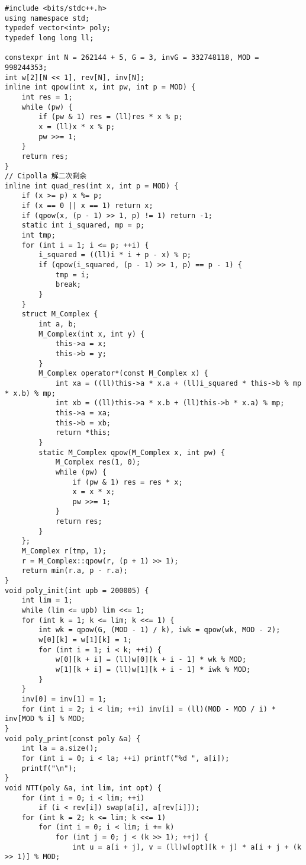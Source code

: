 \begin{verbatim}
#include <bits/stdc++.h>
using namespace std;
typedef vector<int> poly;
typedef long long ll;

constexpr int N = 262144 + 5, G = 3, invG = 332748118, MOD = 998244353;
int w[2][N << 1], rev[N], inv[N];
inline int qpow(int x, int pw, int p = MOD) {
    int res = 1;
    while (pw) {
        if (pw & 1) res = (ll)res * x % p;
        x = (ll)x * x % p;
        pw >>= 1;
    }
    return res;
}
// Cipolla 解二次剩余
inline int quad_res(int x, int p = MOD) {
    if (x >= p) x %= p;
    if (x == 0 || x == 1) return x;
    if (qpow(x, (p - 1) >> 1, p) != 1) return -1;
    static int i_squared, mp = p;
    int tmp;
    for (int i = 1; i <= p; ++i) {
        i_squared = ((ll)i * i + p - x) % p;
        if (qpow(i_squared, (p - 1) >> 1, p) == p - 1) {
            tmp = i;
            break;
        }
    }
    struct M_Complex {
        int a, b;
        M_Complex(int x, int y) {
            this->a = x;
            this->b = y;
        }
        M_Complex operator*(const M_Complex x) {
            int xa = ((ll)this->a * x.a + (ll)i_squared * this->b % mp * x.b) % mp;
            int xb = ((ll)this->a * x.b + (ll)this->b * x.a) % mp;
            this->a = xa;
            this->b = xb;
            return *this;
        }
        static M_Complex qpow(M_Complex x, int pw) {
            M_Complex res(1, 0);
            while (pw) {
                if (pw & 1) res = res * x;
                x = x * x;
                pw >>= 1;
            }
            return res;
        }
    };
    M_Complex r(tmp, 1);
    r = M_Complex::qpow(r, (p + 1) >> 1);
    return min(r.a, p - r.a);
}
void poly_init(int upb = 200005) {
    int lim = 1;
    while (lim <= upb) lim <<= 1;
    for (int k = 1; k <= lim; k <<= 1) {
        int wk = qpow(G, (MOD - 1) / k), iwk = qpow(wk, MOD - 2);
        w[0][k] = w[1][k] = 1;
        for (int i = 1; i < k; ++i) {
            w[0][k + i] = (ll)w[0][k + i - 1] * wk % MOD;
            w[1][k + i] = (ll)w[1][k + i - 1] * iwk % MOD;
        }
    }
    inv[0] = inv[1] = 1;
    for (int i = 2; i < lim; ++i) inv[i] = (ll)(MOD - MOD / i) * inv[MOD % i] % MOD;
}
void poly_print(const poly &a) {
    int la = a.size();
    for (int i = 0; i < la; ++i) printf("%d ", a[i]);
    printf("\n");
}
void NTT(poly &a, int lim, int opt) {
    for (int i = 0; i < lim; ++i)
        if (i < rev[i]) swap(a[i], a[rev[i]]);
    for (int k = 2; k <= lim; k <<= 1)
        for (int i = 0; i < lim; i += k)
            for (int j = 0; j < (k >> 1); ++j) {
                int u = a[i + j], v = (ll)w[opt][k + j] * a[i + j + (k >> 1)] % MOD;

\end{verbatim}
